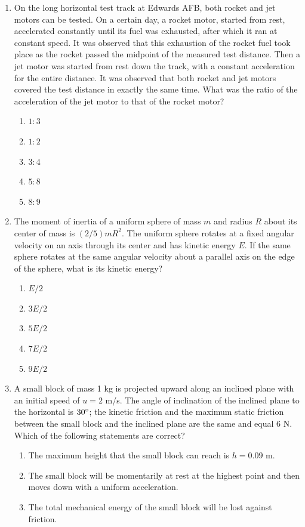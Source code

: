 \documentclass[12pt,letterpaper]{article}
\begin{document}
\begin{enumerate}
\item
On the long horizontal test track at Edwards AFB, both rocket and jet motors can be tested. On a certain day, a rocket motor, started from rest, accelerated constantly until its fuel was exhausted, after which it ran at constant speed. It was observed that this exhaustion of the rocket fuel took place as the rocket passed the midpoint of the measured test distance. Then a jet motor was started from rest down the track, with a constant acceleration for the entire distance. It was observed that both rocket and jet motors covered the test distance in exactly the same time. What was the ratio of the acceleration of the jet motor to that of the rocket motor?
\begin{enumerate}
\item $1:3$
\item $1:2$
\item $3:4$
\item $5:8$
\item $8:9$
\end{enumerate}

\vfill
\newpage

\item
The moment of inertia of a uniform sphere of mass $m$ and radius $R$ about its center of mass is $(2/5)mR^2$. The uniform sphere rotates at a fixed angular velocity on an axis through its center and has kinetic energy $E$. If the same sphere rotates at the same angular velocity about a parallel axis on the edge of the sphere, what is its kinetic energy?
\begin{enumerate}
\item $E/2$
\item $3E/2$
\item $5E/2$
\item $7E/2$
\item $9E/2$
\end{enumerate}

\item
A small block of mass 1 kg is projected upward along an inclined plane with an initial speed of $u = 2$ m/s. The angle of inclination of the inclined plane to the horizontal is $30\degree$; the kinetic friction and the maximum static friction between the small block and the inclined plane are the same and equal 6 N. Which of the following statements are correct?
\begin{enumerate}[label=\Roman*.]
\item The maximum height that the small block can reach is $h = 0.09$ m.
\item The small block will be momentarily at rest at the highest point and then moves down with a uniform acceleration.
\item The total mechanical energy of the small block will be lost against friction.
\end{enumerate}


\end{enumerate}
\end{document}
